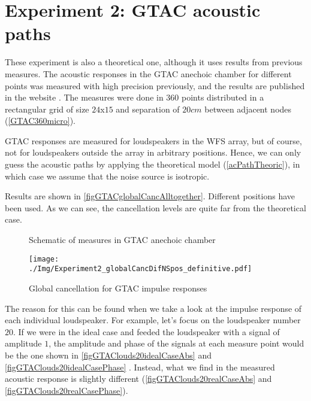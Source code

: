 \section{Experiment 2: GTAC acoustic paths}
These experiment is also a theoretical one, although it uses results from previous measures. The acoustic responses in the GTAC anechoic chamber for different points was measured with high precision previously, and the results are published in the website \cite{GTACroom}. The measures were done in 360 points distributed in a rectangular grid of size $24$x$15$ and separation of $20 \si{cm}$ between adjacent nodes (\autoref{GTAC360micro}).

GTAC responses are measured for loudspeakers in the WFS array, but of course, not for loudspeakers outside the array in arbitrary positions. Hence, we can only guess the acoustic paths by applying the theoretical model (\autoref{acPathTheoric}), in which case we assume that the noise source is isotropic.

Results are shown in \autoref{figGTACglobalCancAlltogether}. Different positions have been used. As we can see, the cancellation levels are quite far from the theoretical case.

\begin{figure}
	\begin{minipage}[b]{0.49\textwidth}
		\centering
		\caption[Schematic of measures in GTAC anechoic chamber]{Schematic of measures in GTAC anechoic chamber}
		\label{GTAC360micro}
	\end{minipage}
	\begin{minipage}[b]{0.49\textwidth}
	\centering
	\texttt{[image: ./Img/Experiment2\_globalCancDifNSpos\_definitive.pdf]}	
	\caption[Global cancellation for GTAC impulse responses]{Global cancellation for GTAC impulse responses}
	\label{figGTACglobalCancAlltogether}
\end{minipage}
\end{figure}

The reason for this can be found when we take a look at the impulse response of each individual loudspeaker. For example, let's focus on the loudspeaker number $20$. If we were in the ideal case and feeded the loudspeaker with a signal of amplitude $1$, the amplitude and phase of the signals at each measure point would be the one shown in \autoref{figGTAClouds20idealCaseAbs} and \autoref{figGTAClouds20idealCasePhase} . Instead, what we find in the measured acoustic response is slightly different (\autoref{figGTAClouds20realCaseAbs} and \autoref{figGTAClouds20realCasePhase}).

